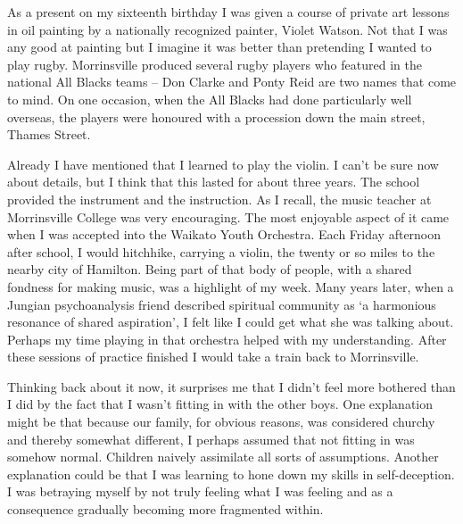 As a present on my sixteenth birthday I was given a course of private
art lessons in oil painting by a nationally recognized painter, Violet
Watson. Not that I was any good at painting but I imagine it was better
than pretending I wanted to play rugby. Morrinsville produced several
rugby players who featured in the national All Blacks teams -- Don
Clarke and Ponty Reid are two names that come to mind. On one occasion,
when the All Blacks had done particularly well overseas, the players
were honoured with a procession down the main street, Thames Street.

Already I have mentioned that I learned to play the violin. I can't be
sure now about details, but I think that this lasted for about three
years. The school provided the instrument and the instruction. As I
recall, the music teacher at Morrinsville College was very encouraging.
The most enjoyable aspect of it came when I was accepted into the
Waikato Youth Orchestra. Each Friday afternoon after school, I would
hitchhike, carrying a violin, the twenty or so miles to the nearby city
of Hamilton. Being part of that body of people, with a shared fondness
for making music, was a highlight of my week. Many years later, when a
Jungian psychoanalysis friend described spiritual community as `a
harmonious resonance of shared aspiration', I felt like I could get what
she was talking about. Perhaps my time playing in that orchestra helped
with my understanding. After these sessions of practice finished I would
take a train back to Morrinsville.

Thinking back about it now, it surprises me that I didn't feel more
bothered than I did by the fact that I wasn't fitting in with the other
boys. One explanation might be that because our family, for obvious
reasons, was considered churchy and thereby somewhat different, I
perhaps assumed that not fitting in was somehow normal. Children naively
assimilate all sorts of assumptions. Another explanation could be that I
was learning to hone down my skills in self-deception. I was betraying
myself by not truly feeling what I was feeling and as a consequence
gradually becoming more fragmented within.

